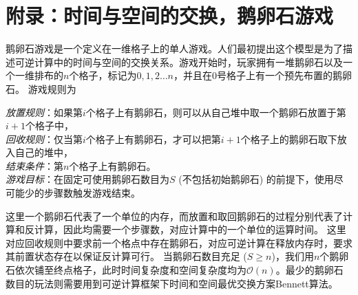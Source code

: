 \documentclass[A4,twoside,UTF8]{ctexart}
\newcommand{\bigO}{{\mathcal{O}}}
\begin{document}
\section*{附录：时间与空间的交换，鹅卵石游戏}\label{sec:pebblegame}
鹅卵石游戏是一个定义在一维格子上的单人游戏。人们最初提出这个模型是为了描述可逆计算中的时间与空间的交换关系。游戏开始时，玩家拥有一堆鹅卵石以及一个一维排布的$n$个格子，标记为$0,1,2\ldots n$，并且在$0$号格子上有一个预先布置的鹅卵石。
游戏规则为
\begin{tcolorbox}[width=\textwidth, title=鹅卵石游戏-可逆计算版本]
    \textit{放置规则}：如果第$i$个格子上有鹅卵石，则可以从自己堆中取一个鹅卵石放置于第$i+1$个格子中，\\
    \textit{回收规则}：仅当第$i$个格子上有鹅卵石，才可以把第$i+1$个格子上的鹅卵石取下放入自己的堆中，\\
    \textit{结束条件}：第$n$个格子上有鹅卵石。\\
    \textit{游戏目标}：在固定可使用鹅卵石数目为$S$ (不包括初始鹅卵石) 的前提下，使用尽可能少的步骤数触发游戏结束。
\end{tcolorbox}
这里一个鹅卵石代表了一个单位的内存，而放置和取回鹅卵石的过程分别代表了计算和反计算，因此均需要一个步骤数，对应计算中的一个单位的运算时间。
这里对应回收规则中要求前一个格点中存在鹅卵石，对应可逆计算在释放内存时，要求其前置状态存在以保证反计算可行。
当鹅卵石数目充足 ($S\geq n$)，我们用$n$个鹅卵石依次铺至终点格子，此时时间复杂度和空间复杂度均为$\bigO(n)$。最少的鹅卵石数目的玩法则需要用到可逆计算框架下时间和空间最优交换方案Bennett算法。
\end{document}
